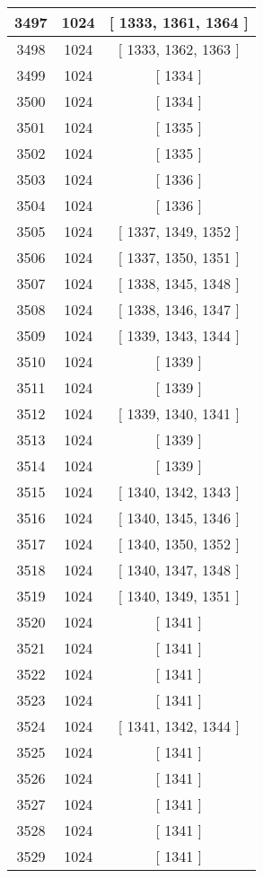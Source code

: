 \begin{center}
\begin{longtable}[H]{|| c c c ||}
\hline
3497 & 1024 & [ 1333, 1361, 1364 ] \\ 
\hline
3498 & 1024 & [ 1333, 1362, 1363 ] \\ 
\hline
3499 & 1024 & [ 1334 ] \\ 
\hline
3500 & 1024 & [ 1334 ] \\ 
\hline
3501 & 1024 & [ 1335 ] \\ 
\hline
3502 & 1024 & [ 1335 ] \\ 
\hline
3503 & 1024 & [ 1336 ] \\ 
\hline
3504 & 1024 & [ 1336 ] \\ 
\hline
3505 & 1024 & [ 1337, 1349, 1352 ] \\ 
\hline
3506 & 1024 & [ 1337, 1350, 1351 ] \\ 
\hline
3507 & 1024 & [ 1338, 1345, 1348 ] \\ 
\hline
3508 & 1024 & [ 1338, 1346, 1347 ] \\ 
\hline
3509 & 1024 & [ 1339, 1343, 1344 ] \\ 
\hline
3510 & 1024 & [ 1339 ] \\ 
\hline
3511 & 1024 & [ 1339 ] \\ 
\hline
3512 & 1024 & [ 1339, 1340, 1341 ] \\ 
\hline
3513 & 1024 & [ 1339 ] \\ 
\hline
3514 & 1024 & [ 1339 ] \\ 
\hline
3515 & 1024 & [ 1340, 1342, 1343 ] \\ 
\hline
3516 & 1024 & [ 1340, 1345, 1346 ] \\ 
\hline
3517 & 1024 & [ 1340, 1350, 1352 ] \\ 
\hline
3518 & 1024 & [ 1340, 1347, 1348 ] \\ 
\hline
3519 & 1024 & [ 1340, 1349, 1351 ] \\ 
\hline
3520 & 1024 & [ 1341 ] \\ 
\hline
3521 & 1024 & [ 1341 ] \\ 
\hline
3522 & 1024 & [ 1341 ] \\ 
\hline
3523 & 1024 & [ 1341 ] \\ 
\hline
3524 & 1024 & [ 1341, 1342, 1344 ] \\ 
\hline
3525 & 1024 & [ 1341 ] \\ 
\hline
3526 & 1024 & [ 1341 ] \\ 
\hline
3527 & 1024 & [ 1341 ] \\ 
\hline
3528 & 1024 & [ 1341 ] \\ 
\hline
3529 & 1024 & [ 1341 ] \\ 

\end{longtable}
\end{center}

